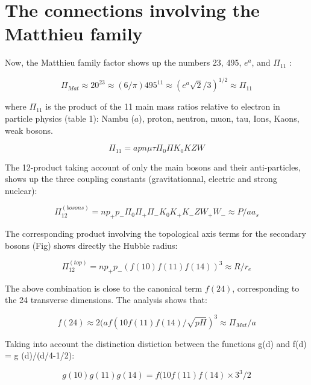 \documentclass[a4paper,9pt]{article}
\begin{document}
\section{The connections involving the Matthieu family}


Now, the Matthieu family factor shows up the numbers 23, 495, $e^a$, and $\Pi_{11}$ :

\begin{equation}
\Pi_{Mat} \approx 20^{23} \approx (6/\pi) 495^{11} \approx (e^a \sqrt 2 /3)^{1/2} \approx \Pi_{11} 
\end{equation}

where $\Pi_{11}$ is the product of the 11 main mass ratios relative to electron in particle physics (table 1): Nambu ($a$), proton, neutron, muon, tau, Ions, Kaons, weak bosons.  

\begin{equation}
\Pi_{11} = a  p  n  \mu \tau  \Pi_0  \Pi  K_0  K  Z   W 
\end{equation}

The 12-product taking account of only the main bosons and their anti-particles, shows up the three coupling constants (gravitationnal, electric and strong nuclear):


\begin{equation}
\Pi_{12}^{(bosons)} = n p_+ p_-  \Pi_0   \Pi_+    \Pi_-  K_0  K_+  K_- Z   W_+  W_-  \approx P/aa_s
\end{equation}

The corresponding product involving the topological axis terms for the secondary bosons (Fig) shows directly the Hubble radius: 

\begin{equation}
\Pi_{12}^{(top)} = n p_+ p_- (f(10) f(11) f(14))^3 \approx R/r_e
\end{equation}

The above combination is close to the canonical term $f(24)$, corresponding to the 24 transverse dimensions. The analysis shows that:

\begin{equation}
f(24) \approx 2(a f(10 f(11) f(14)/ \sqrt{pH})^3 \approx \Pi_{Mat}/a
\end{equation}

Taking into account the distinction distiction between the functions g(d) and f(d) = g (d)/(d/4-1/2):

\begin{equation}
g(10) g(11)g(14) = f(10 f(11) f(14) \times 3^3/2
\end{equation}
\end{document}
